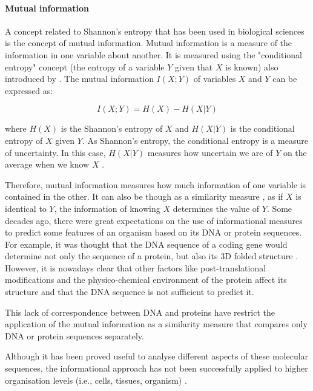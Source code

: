 \paragraph{Mutual information}

A concept related to Shannon's entropy that has been used in biological sciences is the concept of mutual information. Mutual information is a measure of the information in one variable about another. It is measured using the "conditional entropy" concept (the entropy of a variable $Y$ given that $X$ is known) also introduced by \citet{Shannon1948}.
The mutual information $I(X;Y)$ of variables $X$ and $Y$ can be expressed as:
 
 $$I(X;Y) = H(X) - H(X|Y)$$

where $H(X)$ is the Shannon's entropy of $X$ and $H(X|Y)$ is the conditional entropy of $X$ given $Y$. As Shannon's entropy, the conditional entropy is a measure of uncertainty. In this case, $H(X|Y)$ measures how uncertain we are of $Y$ on the average when we know $X$ \citep{Shannon1948}.

Therefore, mutual information measures how much information of one variable is contained in the other. It can also be though as a similarity measure \citep{yockey2005information}, as if $X$ is identical to $Y$, the information of knowing $X$ determines the value of $Y$.
Some decades ago, there were great expectations on the use of informational measures to predict some features of an organism based on its DNA or protein sequences. For example, it was thought that the DNA sequence of a coding gene would determine not only the sequence of a protein, but also its 3D folded structure \citep{Anfinsen1973}.
However, it is nowadays clear that other factors like post-translational modifications and the physico-chemical environment of the protein affect its structure \citep{Kang2009} and that the DNA sequence is not sufficient to predict it.

This lack of correspondence between DNA and proteins have restrict the application of the mutual information as a similarity measure that compares only DNA \citep{Lichtenstein2015} or protein sequences \citep{Gloor2005} separately.

Although it has been proved useful to analyse different aspects of these molecular sequences, the informational approach has not been successfully applied to higher organisation levels (i.e., cells, tissues, organism) \citep{Longo2012}. 

